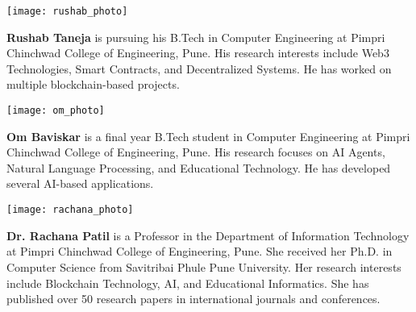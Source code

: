 \documentclass[a4paper,12pt]{article}
\begin{document}
\vspace{1cm}

\begin{minipage}{0.2\textwidth}
\texttt{[image: rushab\_photo]}
\end{minipage}
\begin{minipage}{0.75\textwidth}
\textbf{Rushab Taneja} is pursuing his B.Tech in Computer Engineering at Pimpri Chinchwad College of Engineering, Pune. His research interests include Web3 Technologies, Smart Contracts, and Decentralized Systems. He has worked on multiple blockchain-based projects.
\end{minipage}

\vspace{1cm}

\begin{minipage}{0.2\textwidth}
\texttt{[image: om\_photo]}
\end{minipage}
\begin{minipage}{0.75\textwidth}
\textbf{Om Baviskar} is a final year B.Tech student in Computer Engineering at Pimpri Chinchwad College of Engineering, Pune. His research focuses on AI Agents, Natural Language Processing, and Educational Technology. He has developed several AI-based applications.
\end{minipage}

\vspace{1cm}

\begin{minipage}{0.2\textwidth}
\texttt{[image: rachana\_photo]}
\end{minipage}
\begin{minipage}{0.75\textwidth}
\textbf{Dr. Rachana Patil} is a Professor in the Department of Information Technology at Pimpri Chinchwad College of Engineering, Pune. She received her Ph.D. in Computer Science from Savitribai Phule Pune University. Her research interests include Blockchain Technology, AI, and Educational Informatics. She has published over 50 research papers in international journals and conferences.
\end{minipage}
\end{document}
